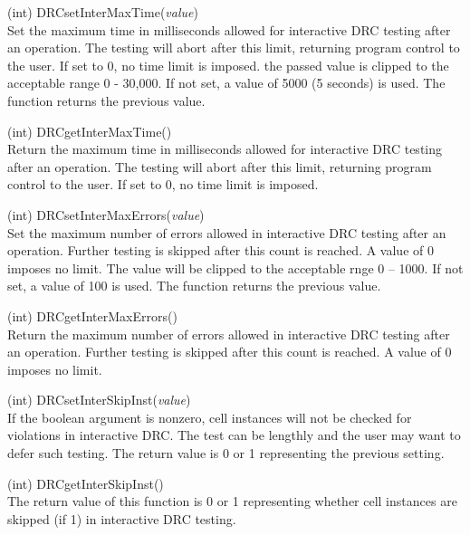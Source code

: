 \begin{description}
\item{(int) \vt DRCsetInterMaxTime({\it value\/})}\\
Set the maximum time in milliseconds allowed for interactive DRC
testing after an operation.  The testing will abort after this limit,
returning program control to the user.  If set to 0, no time limit is
imposed.  the passed value is clipped to the acceptable range 0 -
30,000.  If not set, a value of 5000 (5 seconds) is used.  The
function returns the previous value.

\item{(int) \vt DRCgetInterMaxTime()}\\
Return the maximum time in milliseconds allowed for interactive DRC
testing after an operation.  The testing will abort after this limit,
returning program control to the user.  If set to 0, no time limit is
imposed.

\item{(int) \vt DRCsetInterMaxErrors({\it value\/})}\\
Set the maximum number of errors allowed in interactive DRC testing
after an operation.  Further testing is skipped after this count is
reached.  A value of 0 imposes no limit.  The value will be clipped to
the acceptable rnge 0 -- 1000.  If not set, a value of 100 is used. 
The function returns the previous value.

\item{(int) \vt DRCgetInterMaxErrors()}\\
Return the maximum number of errors allowed in interactive DRC testing
after an operation.  Further testing is skipped after this count is
reached.  A value of 0 imposes no limit.

\item{(int) \vt DRCsetInterSkipInst({\it value\/})}\\
If the boolean argument is nonzero, cell instances will not be checked
for violations in interactive DRC.  The test can be lengthly and the
user may want to defer such testing.  The return value is 0 or 1
representing the previous setting.

\item{(int) \vt DRCgetInterSkipInst()}\\
The return value of this function is 0 or 1 representing whether cell
instances are skipped (if 1) in interactive DRC testing.


\end{description}
